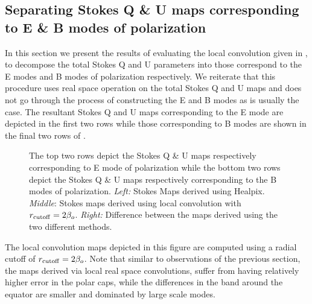 \subsection{Separating Stokes Q \& U maps corresponding to E \& B modes of polarization}
In this section we present the results of evaluating the local convolution given in , to decompose the total Stokes Q and U parameters into those correspond to the E modes and B modes of polarization respectively. We reiterate that this procedure uses real space operation on the total Stokes Q and U maps and does not go through the process of constructing the E and B modes as is usually the case. The resultant Stokes Q and U maps corresponding to the E mode are depicted in the first two rows while those corresponding to B modes are shown in the final two rows of . 
%
\begin{figure}[!t] 
\centering
{}

\caption{The top two rows depict the Stokes Q \& U maps  respectively corresponding to E mode of polarization while the bottom two rows depict  the Stokes Q \& U maps  respectively corresponding to the  B modes of polarization. \textit{Left:} Stokes Maps derived using Healpix. \textit{Middle}: Stokes maps derived using local convolution with $r_{\rm cutoff} = 2 \beta_o$. \textit{Right:} Difference between the maps derived using the two different methods.}
\label{fig:equ-bqu-maps-compare}
\end{figure}
%
The local convolution maps depicted in this figure are computed using a radial cutoff of $r_{\rm cutoff }=2\beta_o$. Note that similar to observations of the previous section, the maps derived via local real space convolutions, suffer from having relatively higher error in the polar caps, while the differences in the  band around the equator are smaller and dominated by large scale modes.


